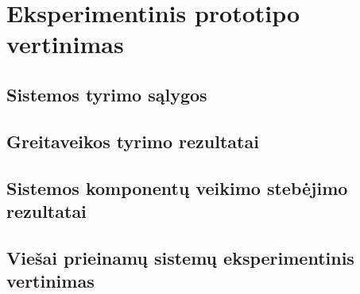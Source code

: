 \section{Eksperimentinis prototipo vertinimas}
\subsection{Sistemos tyrimo sąlygos}
\subsection{Greitaveikos tyrimo rezultatai}
\subsection{Sistemos komponentų veikimo stebėjimo rezultatai}
\subsection{Viešai prieinamų sistemų eksperimentinis vertinimas}